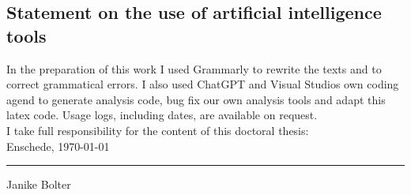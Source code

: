 \subsection{Statement on the use of artificial intelligence tools}
    In the preparation of this work I used Grammarly to rewrite the texts and to correct grammatical errors.
    I also used ChatGPT and Visual Studios own coding agend to generate analysis code, bug fix our own analysis tools and adapt this latex code. 
Usage logs, including dates, are available on request.\\[2\baselineskip]

I take full responsibility for the content of this doctoral thesis:
    \vspace{0.5cm}\\
    Enschede, \today\vspace{1cm}\hfill \parbox[t]{5cm}{\centering\hrule\medskip Janike Bolter}

	



